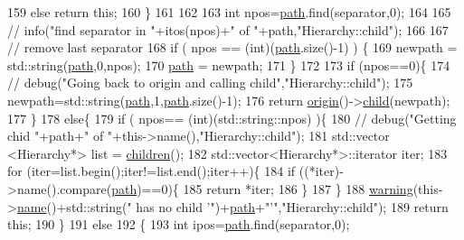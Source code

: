\begin{DoxyCode}
159     \textcolor{keywordflow}{else} \textcolor{keywordflow}{return} \textcolor{keyword}{this};
160   \}
161 
162 
163   \textcolor{keywordtype}{int} npos=\hyperlink{classHierarchy_aa7990fa7caf132d83e361ce033c6c65a}{path}.find(separator,0);
164 
165   \textcolor{comment}{//  info("find separator in "+itos(npos)+" of "+path,"Hierarchy::child");}
166 
167   \textcolor{comment}{// remove last separator}
168   \textcolor{keywordflow}{if} ( npos == (\textcolor{keywordtype}{int})(\hyperlink{classHierarchy_aa7990fa7caf132d83e361ce033c6c65a}{path}.size()-1) ) \{
169     newpath = std::string(\hyperlink{classHierarchy_aa7990fa7caf132d83e361ce033c6c65a}{path},0,npos);
170     \hyperlink{classHierarchy_aa7990fa7caf132d83e361ce033c6c65a}{path} = newpath;
171   \}
172 
173   \textcolor{keywordflow}{if} (npos==0)\{
174     \textcolor{comment}{//    debug("Going back to origin and calling child","Hierarchy::child");}
175     newpath=std::string(\hyperlink{classHierarchy_aa7990fa7caf132d83e361ce033c6c65a}{path},1,\hyperlink{classHierarchy_aa7990fa7caf132d83e361ce033c6c65a}{path}.size()-1);
176     \textcolor{keywordflow}{return} \hyperlink{classHierarchy_aee461dc930ce3871636ff87f075b1b83}{origin}()->\hyperlink{classHierarchy_a1e207f973c694b538bf90107b4868817}{child}(newpath);
177   \}
178   \textcolor{keywordflow}{else}\{
179     \textcolor{keywordflow}{if} ( npos== (\textcolor{keywordtype}{int})(std::string::npos) )\{
180       \textcolor{comment}{//      debug("Getting chid "+path+" of "+this->name(),"Hierarchy::child");}
181       std::vector <Hierarchy*> list = \hyperlink{classHierarchy_aa9a76f69e98e052ee1a6e32cea006288}{children}();
182       std::vector<Hierarchy*>::iterator iter;
183       \textcolor{keywordflow}{for} (iter=list.begin();iter!=list.end();iter++)\{
184         \textcolor{keywordflow}{if} ((*iter)->name().compare(\hyperlink{classHierarchy_aa7990fa7caf132d83e361ce033c6c65a}{path})==0)\{
185           \textcolor{keywordflow}{return} *iter;
186         \}
187       \}
188       \hyperlink{classObject_a65cd4fda577711660821fd2cd5a3b4c9}{warning}(this->\hyperlink{classObject_a300f4c05dd468c7bb8b3c968868443c1}{name}()+std::string(\textcolor{stringliteral}{" has no child '"})+\hyperlink{classHierarchy_aa7990fa7caf132d83e361ce033c6c65a}{path}+\textcolor{stringliteral}{"'"},\textcolor{stringliteral}{"Hierarchy::child"});
189       \textcolor{keywordflow}{return} \textcolor{keyword}{this};
190     \}
191     \textcolor{keywordflow}{else}
192     \{
193       \textcolor{keywordtype}{int} ipos=\hyperlink{classHierarchy_aa7990fa7caf132d83e361ce033c6c65a}{path}.find(separator,0);

\end{DoxyCode}
